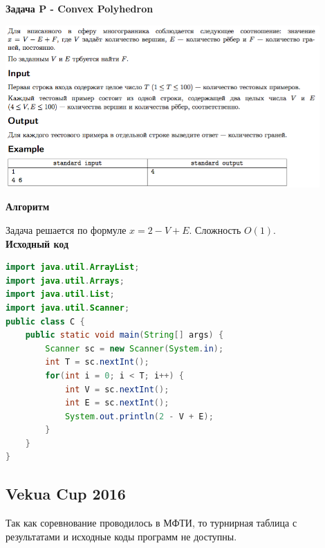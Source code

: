 \documentclass[a4paper,12pt]{article}
\begin{document}
\newpage
\textbf{{\large Задача P - Convex Polyhedron}}

\begin{center}
\includegraphics[width=0.9\textwidth]{OC_Moscow/P.png}\\ [1cm]
\end{center}

\textbf{{\large Алгоритм}}

Задача решается по формуле $x = 2 - V + E$. Сложность $O(1)$. \\

\textbf{{\large Исходный код}} \\
\begin{lstlisting}[language=Java]
import java.util.ArrayList;
import java.util.Arrays;
import java.util.List;
import java.util.Scanner;
public class C {    
    public static void main(String[] args) {        
        Scanner sc = new Scanner(System.in);
        int T = sc.nextInt();
        for(int i = 0; i < T; i++) {
            int V = sc.nextInt();
            int E = sc.nextInt();            
            System.out.println(2 - V + E);
        }
    }
}
\end{lstlisting}





%
%
\newpage
\subsection{Vekua Cup 2016}

Так как соревнование проводилось в МФТИ, то турнирная таблица с результатами и исходные коды программ не доступны. \\
\end{document}
